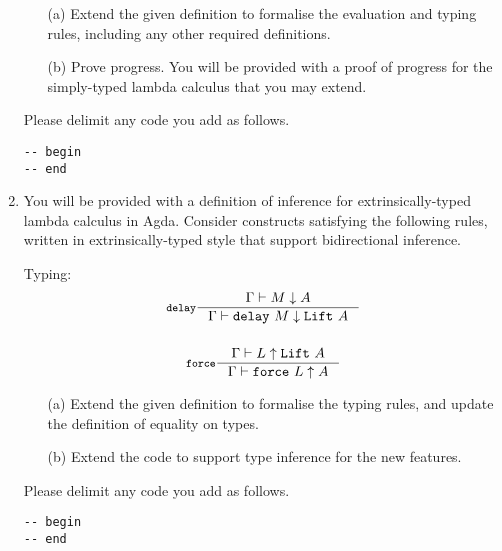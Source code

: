 \documentclass{examhons2018}
\begin{document}
\begin{enumerate}
\begin{enumerate}
\item[(a)] Extend the given definition to formalise the evaluation and
  typing rules, including any other required definitions.

\item[(b)] Prove progress. You will be provided with a proof of
  progress for the simply-typed lambda calculus that you may
  extend.
\end{enumerate}

Please delimit any code you add as follows.
\begin{verbatim}
-- begin
-- end
\end{verbatim}

\newpage

\item \rubricqC

\newcommand{\Lift}{\texttt{Lift}}
\newcommand{\delay}{\texttt{delay}}
\newcommand{\force}{\texttt{force}}
\newcommand{\up}{\uparrow}
\newcommand{\dn}{\downarrow}

You will be provided with a definition of inference for extrinsically-typed lambda
calculus in Agda. Consider constructs satisfying the following rules,
written in extrinsically-typed style that support bidirectional inference.

Typing:
\begin{gather*}
\inference[$\delay$]
  {\Gamma \vdash M \dn A}
  {\Gamma \vdash \delay~M \dn \Lift~A}
\\~\\
\inference[$\force$]
  {\Gamma \vdash L \up \Lift~A}
  {\Gamma \vdash \force~L \up A}
\end{gather*}

\begin{enumerate}
\item[(a)] Extend the given definition to formalise the typing rules,
and update the definition of equality on types.

\item[(b)] Extend the code to support type inference for the new features.
\end{enumerate}

Please delimit any code you add as follows.
\begin{verbatim}
-- begin
-- end
\end{verbatim}

\end{enumerate}

%
%
\end{document}
